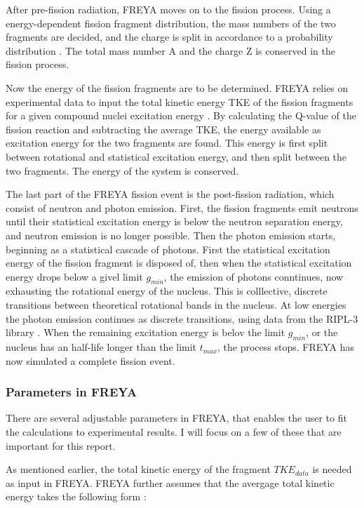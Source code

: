\documentclass[]{article}
\begin{document}
After pre-fission radiation, FREYA moves on to the fission process. Using a energy-dependent fission fragment distribution, the mass numbers of the two fragments are decided, and the charge is split in accordance to a probability distribution \cite{FREYAusemanual}. The total mass number A and the charge Z is conserved in the fission process.

Now the energy of the fission fragments are to be determined. FREYA relies on experimental data to input the total kinetic energy TKE of the fission fragments for a given compound nuclei excitation energy \cite{FREYAusemanual}. By calculating the Q-value of the fission reaction and subtracting the average TKE, the energy available as excitation energy for the two fragments are found. This energy is first split between rotational and statistical excitation energy, and then split between the two fragments. The energy of the system is conserved. 

The last part of the FREYA fission event is the post-fission radiation, which consist of neutron and photon emission. First, the fission fragments emit neutrons until their statistical excitation energy is below the neutron separation energy, and neutron emission is no longer possible. Then the photon emission starts, beginning as a statistical cascade of photons. First the statistical excitation energy of the fission fragment is disposed of, then when the statistical excitation energy drops below a givel limit $g_{min}$, the emission of photons conntinues, now exhausting the rotational energy of the nucleus. This is colllective, discrete transitions between theoretical rotational bands in the nucleus. At low energies the photon emission continues as discrete transitions, using data from the RIPL-3 library \cite{FREYAusemanual}. When the remaining excitation energy is belov the limit $g_{min}$, or the nucleus has an half-life longer than the limit $t_{max}$, the process stops. FREYA has now simulated a complete fission event.

\subsubsection{Parameters in FREYA}
There are several adjustable parameters in FREYA, that enables the user to fit the calculations to experimental results. I will focus on a few of these that are important for this report. 

As mentioned earlier, the total kinetic energy of the fragment $TKE_{data}$ is needed as input in FREYA. FREYA further assumes that the avergage total kinetic energy takes the following form \cite{FREYAusemanual}:
\end{document}
